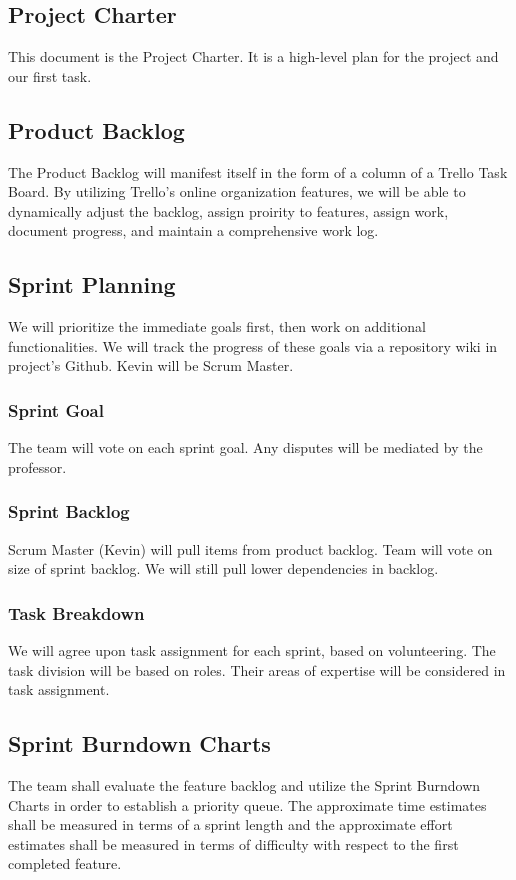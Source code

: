 

\subsection{Project Charter}
This document is the Project Charter. It is a high-level plan for the project and our first task.

\subsection{Product Backlog}
The Product Backlog will manifest itself in the form of a column of a Trello Task Board. By utilizing Trello's online organization features, we will be able to dynamically adjust the backlog, assign proirity to features, assign work, document progress, and maintain a comprehensive work log.

\subsection{Sprint Planning}
We will prioritize the immediate goals first, then work on additional functionalities. We will track the progress of these goals via a repository wiki in project's Github. Kevin will be Scrum Master. 

\subsubsection{Sprint Goal}
The team will vote on each sprint goal. Any disputes will be mediated by the professor.

\subsubsection{Sprint Backlog}
Scrum Master (Kevin) will pull items from product backlog. Team will vote on size of sprint backlog. We will still pull lower dependencies in backlog.

\subsubsection{Task Breakdown}
We will agree upon task assignment for each sprint, based on volunteering. The task division will be based on roles.
Their areas of expertise will be considered in task assignment.

\subsection{Sprint Burndown Charts}
The team shall evaluate the feature backlog and utilize the Sprint Burndown Charts in order to establish a priority queue. The approximate time estimates shall be measured in terms of a sprint length and the approximate effort estimates shall be measured in terms of difficulty with respect to the first completed feature.

